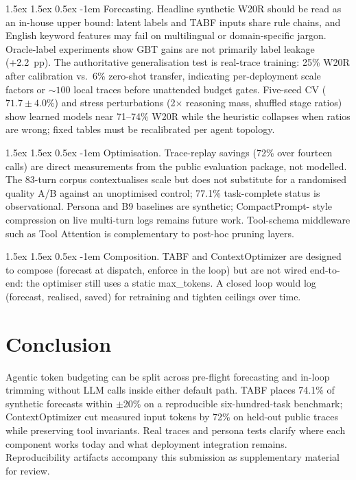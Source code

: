 \documentclass[journal]{IEEEtran}
\makeatletter
\newcommand{\code}[1]{{\small #1}}
\renewcommand\paragraph{\@startsection{paragraph}{4}{0pt}%
  {1.5ex \@plus 1.5ex \@minus 0.5ex}%
  {-1em}%
  {\normalfont\normalsize}}
\makeatother
\begin{document}
\paragraph{Forecasting.}
Headline synthetic W20R should be read as an in-house upper bound: latent labels
and TABF inputs share rule chains, and English keyword features may fail on
multilingual or domain-specific jargon. Oracle-label experiments show GBT gains
are not primarily label leakage (+2.2~pp). The authoritative generalisation test
is real-trace training: 25\% W20R after calibration vs.\ 6\% zero-shot transfer,
indicating per-deployment scale factors or ${\sim}100$ local traces before
unattended budget gates. Five-seed CV ($71.7\pm4.0\%$) and stress perturbations
(2$\times$ reasoning mass, shuffled stage ratios) show learned models near 71--74\%
W20R while the heuristic collapses when ratios are wrong; fixed tables must be
recalibrated per agent topology.

\paragraph{Optimisation.}
Trace-replay savings (72\% over fourteen calls) are direct measurements from the
public evaluation package, not modelled. The 83-turn corpus contextualises scale but does not substitute
for a randomised quality A/B against an unoptimised control; 77.1\% task-complete
status is observational. Persona and B9 baselines are synthetic; CompactPrompt-
style compression on live multi-turn logs remains future work. Tool-schema
middleware such as Tool Attention is complementary to post-hoc pruning layers.

\paragraph{Composition.}
TABF and ContextOptimizer are designed to compose (forecast at dispatch,
enforce in the loop) but are not wired end-to-end: the optimiser still uses a
static \code{max\_tokens}. A closed loop would log (forecast, realised, saved)
for retraining and tighten ceilings over time.

\section{Conclusion}
\label{sec:conclusion}

Agentic token budgeting can be split across pre-flight forecasting and in-loop
trimming without LLM calls inside either default path. TABF places 74.1\% of
synthetic forecasts within $\pm$20\% on a reproducible six-hundred-task benchmark;
ContextOptimizer cut measured input tokens by 72\% on held-out public traces while preserving
tool invariants. Real traces and persona tests clarify where each component
works today and what deployment integration remains. Reproducibility artifacts
accompany this submission as supplementary material for review.



\end{document}
